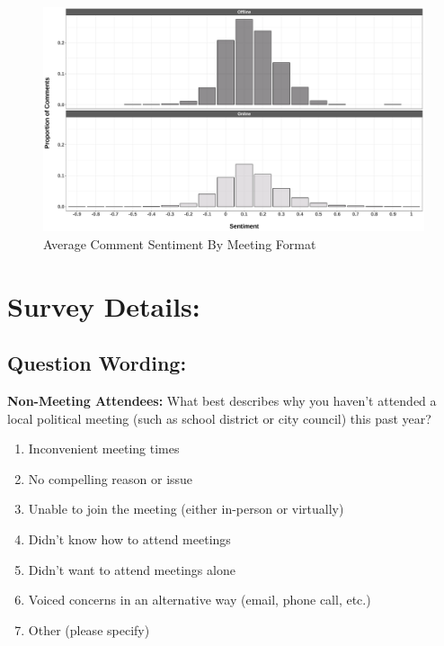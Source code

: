 \begin{figure}[H]
    \centering
    \caption{Average Comment Sentiment By Meeting Format}
    \label{fig:Sentiment}
    \includegraphics[scale=0.35]{Figures/Sentiment.pdf}
\end{figure}



    
    
    \section{Survey Details:}
    \subsection{Question Wording:}

    \small
      \noindent \textbf{Non-Meeting Attendees:} What best describes why you haven't attended a local political meeting (such as school district or city council) this past year?
      \begin{enumerate}
        \item Inconvenient meeting times
        \item No compelling reason or issue
        \item Unable to join the meeting (either in-person or virtually)
        \item Didn’t know how to attend meetings
        \item Didn’t want to attend meetings alone
        \item Voiced concerns in an alternative way (email, phone call, etc.)
        \item Other (please specify)
      \end{enumerate}


